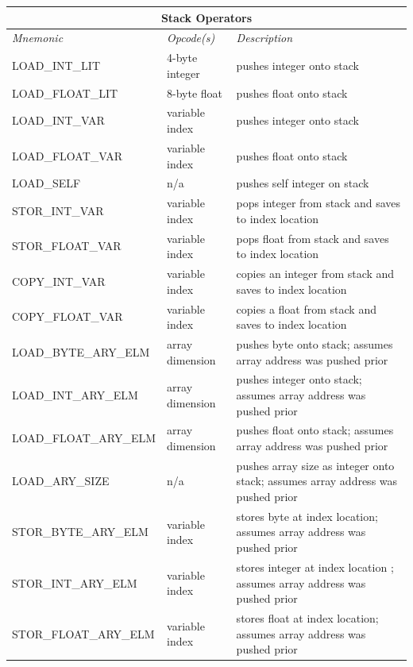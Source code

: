 \documentclass[12pt]{article}
\begin{document}
\begin{center}
\begin{tabular}{| l | l | p{6 cm} |}
\hline
\multicolumn{3}{|c|}{\textbf{Stack Operators}} \\
\hline
\emph{Mnemonic}  &  \emph{Opcode(s)}  &  \emph{Description} \\ \hline \hline
LOAD\_INT\_LIT & 4-byte integer & pushes integer onto stack  \\ \hline
LOAD\_FLOAT\_LIT & 8-byte float & pushes float onto stack \\ \hline
LOAD\_INT\_VAR & variable index & pushes integer onto stack \\ \hline
LOAD\_FLOAT\_VAR & variable index & pushes float onto stack \\ \hline
LOAD\_SELF & n/a & pushes self integer on stack \\ \hline
STOR\_INT\_VAR & variable index & pops integer from stack and saves to index location \\ \hline
STOR\_FLOAT\_VAR & variable index & pops float from stack and saves to index location \\ \hline
COPY\_INT\_VAR & variable index & copies an integer from stack and saves to index location \\ \hline
COPY\_FLOAT\_VAR & variable index & copies a float from stack and saves to index location \\ \hline
LOAD\_BYTE\_ARY\_ELM & array dimension & pushes byte onto stack; assumes array address was pushed prior \\ \hline
LOAD\_INT\_ARY\_ELM & array dimension & pushes integer onto stack; assumes array address was pushed prior \\ \hline
LOAD\_FLOAT\_ARY\_ELM & array dimension & pushes float onto stack; assumes array address was pushed prior \\ \hline
LOAD\_ARY\_SIZE & n/a & pushes array size as integer onto stack; assumes array address was pushed prior \\ \hline
STOR\_BYTE\_ARY\_ELM & variable index & stores byte at index location; assumes array address was pushed prior \\ \hline
STOR\_INT\_ARY\_ELM & variable index & stores integer at index location ; assumes array address was pushed prior \\ \hline
STOR\_FLOAT\_ARY\_ELM & variable index & stores float at index location; assumes array address was pushed prior \\ \hline
\end{tabular}


\end{center}
\end{document}
